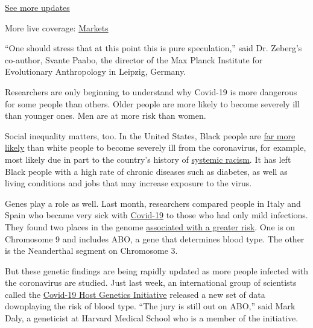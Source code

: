 \href{https://www.nytimes.com/2020/08/01/world/coronavirus-covid-19.html?action=click\&pgtype=Article\&state=default\&region=MAIN_CONTENT_1\&context=storylines_live_updates}{See
more updates}

More live coverage:
\href{https://www.nytimes.com/live/2020/07/31/business/stock-market-today-coronavirus?action=click\&pgtype=Article\&state=default\&region=MAIN_CONTENT_1\&context=storylines_live_updates}{Markets}

``One should stress that at this point this is pure speculation,'' said
Dr. Zeberg's co-author, Svante Paabo, the director of the Max Planck
Institute for Evolutionary Anthropology in Leipzig, Germany.

Researchers are only beginning to understand why Covid-19 is more
dangerous for some people than others. Older people are more likely to
become severely ill than younger ones. Men are at more risk than women.

Social inequality matters, too. In the United States, Black people are
\href{https://www.cdc.gov/coronavirus/2019-ncov/need-extra-precautions/racial-ethnic-minorities.html}{far
more likely} than white people to become severely ill from the
coronavirus, for example, most likely due in part to the country's
history of
\href{https://www.nytimes.com/2020/04/29/magazine/racial-disparities-covid-19.html}{systemic
racism}. It has left Black people with a high rate of chronic diseases
such as diabetes, as well as living conditions and jobs that may
increase exposure to the virus.

Genes play a role as well. Last month, researchers compared people in
Italy and Spain who became very sick with
\href{https://www.nytimes.com/2020/07/08/health/coronavirus-risk-factors.html}{Covid-19}
to those who had only mild infections. They found two places in the
genome
\href{https://www.nytimes.com/2020/06/03/health/coronavirus-blood-type-genetics.html}{associated
with a greater risk}. One is on Chromosome 9 and includes ABO, a gene
that determines blood type. The other is the Neanderthal segment on
Chromosome 3.

But these genetic findings are being rapidly updated as more people
infected with the coronavirus are studied. Just last week, an
international group of scientists called the
\href{https://www.covid19hg.org/}{Covid-19 Host Genetics Initiative}
released a new set of data downplaying the risk of blood type. ``The
jury is still out on ABO,'' said Mark Daly, a geneticist at Harvard
Medical School who is a member of the initiative.


